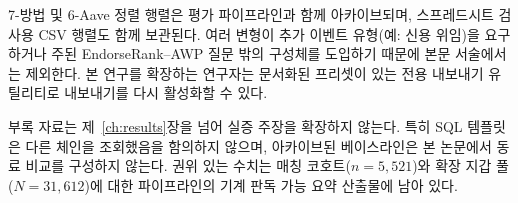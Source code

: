
7-방법 및 6-Aave 정렬 행렬은 평가 파이프라인과 함께 아카이브되며, 스프레드시트 검사용 CSV 행렬도 함께 보관된다. 여러 변형이 추가 이벤트 유형(예: 신용 위임)을 요구하거나 주된 EndorseRank--AWP 질문 밖의 구성체를 도입하기 때문에 본문 서술에서는 제외한다. 본 연구를 확장하는 연구자는 문서화된 프리셋이 있는 전용 내보내기 유틸리티로 내보내기를 다시 활성화할 수 있다.


부록 자료는 제~\ref{ch:results}장을 넘어 실증 주장을 확장하지 않는다. 특히 SQL 템플릿은 다른 체인을 조회했음을 함의하지 않으며, 아카이브된 베이스라인은 본 논문에서 동료 비교를 구성하지 않는다. 권위 있는 수치는 매칭 코호트($n=5{,}521$)와 확장 지갑 풀($N=31{,}612$)에 대한 파이프라인의 기계 판독 가능 요약 산출물에 남아 있다.
